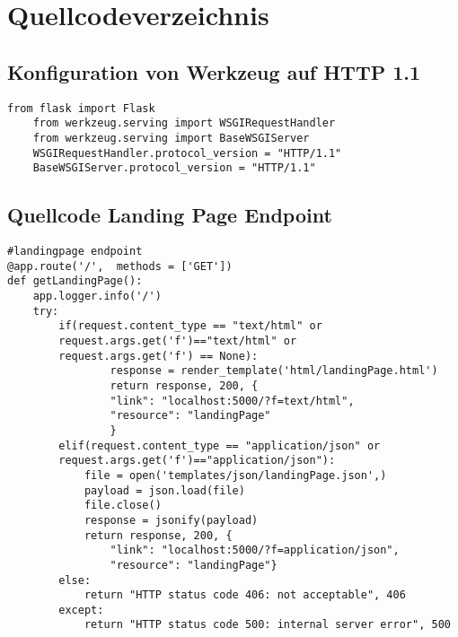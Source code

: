 \newpage
\restoregeometry
{}
\renewcommand{\lstlistingname}{Quellcode}
\section{Quellcodeverzeichnis}
\subsection{Konfiguration von Werkzeug auf HTTP 1.1}
\begin{lstlisting}[caption={Konfiguration von Werkzeug auf HTTP 1.1}, style = Python]
    from flask import Flask
    from werkzeug.serving import WSGIRequestHandler
    from werkzeug.serving import BaseWSGIServer
    WSGIRequestHandler.protocol_version = "HTTP/1.1"
    BaseWSGIServer.protocol_version = "HTTP/1.1"
\end{lstlisting}\label{appendixconfWerkzeug}

\subsection{Quellcode Landing Page Endpoint}
\begin{lstlisting}[caption={Landing Page Endpoint}, style = Python]
#landingpage endpoint
@app.route('/',  methods = ['GET'])
def getLandingPage():
    app.logger.info('/') 
    try:
        if(request.content_type == "text/html" or
        request.args.get('f')=="text/html" or 
        request.args.get('f') == None):
                response = render_template('html/landingPage.html') 
                return response, 200, {
                "link": "localhost:5000/?f=text/html", 
                "resource": "landingPage"
                } 
        elif(request.content_type == "application/json" or
        request.args.get('f')=="application/json"): 
            file = open('templates/json/landingPage.json',) 
            payload = json.load(file) 
            file.close() 
            response = jsonify(payload) 
            return response, 200, {
                "link": "localhost:5000/?f=application/json", 
                "resource": "landingPage"} 
        else:
            return "HTTP status code 406: not acceptable", 406 
        except:
            return "HTTP status code 500: internal server error", 500 
\end{lstlisting}\label{appendixLandingPage}

\newpage
